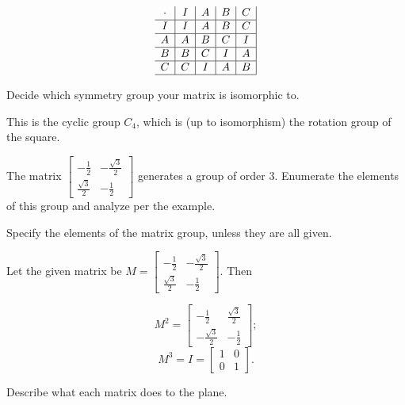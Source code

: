 \documentclass[../key.tex]{subfiles}
\begin{document}
$$\begin{array}{c|c|c|c|c|}
\cdot & I & A & B & C \\ \hline
I & I & A & B & C \\ \hline
A & A & B & C & I \\ \hline
B & B & C & I & A \\ \hline
C & C & I & A & B \\ \hline
\end{array}$$

\begin{iinner_problem}
\item Decide which symmetry group your matrix is isomorphic to.
\end{iinner_problem}

This is the cyclic group $C_4$, which is (up to isomorphism) the rotation group of the square.

\begin{outer_problem}
\item The matrix $\left[\begin{array}{cc} -\frac{1}{2} & -\frac{\sqrt{3}}{2} \\ \frac{\sqrt{3}}{2} & -\frac{1}{2}\end{array}\right]$ generates a group of order $3$. Enumerate the elements of this group and analyze per the example.
\end{outer_problem}

\begin{iinner_problem}[start=1]
\item Specify the elements of the matrix group, unless they are all given.
\end{iinner_problem}

Let the given matrix be $M=\begin{bmatrix} -\frac{1}{2} & -\frac{\sqrt{3}}{2} \\ \frac{\sqrt{3}}{2} & -\frac{1}{2}\end{bmatrix}$. Then

$$M^2=\begin{bmatrix} -\frac{1}{2} & \frac{\sqrt{3}}{2} \\ -\frac{\sqrt{3}}{2} & -\frac{1}{2}\end{bmatrix};$$
$$M^3=I=\begin{bmatrix} 1 & 0 \\ 0 & 1 \end{bmatrix}.$$

\begin{iinner_problem}
\item Describe what each matrix does to the plane.
\end{iinner_problem}
\end{document}
